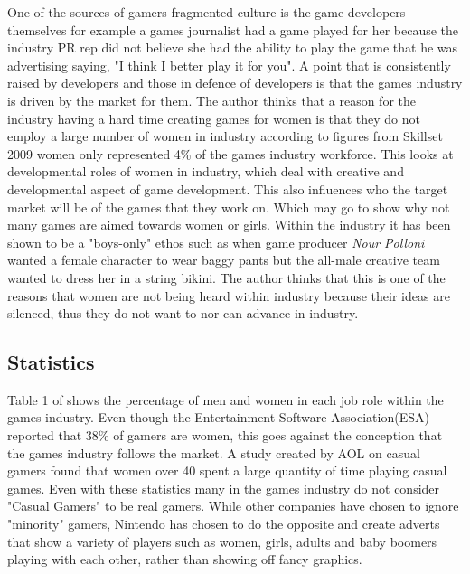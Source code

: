 \documentclass[11pt]{scrartcl}
\begin{document}
One of the sources of gamers fragmented culture is the game developers themselves for example a games journalist had a game played for her because the industry PR rep did not believe she had the ability to play the game that he was advertising saying, "I think I better play it for you"\cite{consalvo2012confronting}. A point that is consistently raised by developers and those in defence of developers is that the games industry is driven by the market for them.\cite{fron2007hegemony} The author thinks that a reason for the industry having a hard time creating games for women is that they do not employ a large number of women in industry according to figures from Skillset 2009 women only represented 4\% of the games industry workforce.\cite{skillset_2009} This looks at developmental roles of women in industry, which deal with creative and developmental aspect of game development. This also influences who the target market will be of the games that they work on.\cite{prescott2011segregation} Which may go to show why not many games are aimed towards women or girls. Within the industry it has been shown to be a "boys-only" ethos such as when game producer \emph{Nour Polloni} wanted a female character to wear baggy pants but the all-male creative team wanted to dress her in a string bikini. The author thinks that this is one of the reasons that women are not being heard within industry because their ideas are silenced, thus they do not want to nor can advance in industry.


\subsection{Statistics}

Table 1 of \cite{prescott2011segregation} shows the percentage of men and women in each job role within the games industry. Even though the Entertainment Software Association(ESA) reported that 38\% of gamers are women, this goes against the conception that the games industry follows the market\cite{fron2007hegemony}. A study created by AOL on casual gamers found that women over 40 spent a large quantity of time playing casual games.\cite{pearce2008truth} Even with these statistics many in the games industry do not consider "Casual Gamers" to be real gamers. While other companies have chosen to ignore "minority" gamers, Nintendo has chosen to do the opposite and create adverts that show a variety of players such as women, girls, adults and baby boomers playing with each other, rather than showing off fancy graphics.\cite{surowiecki_2017}




\end{document}
